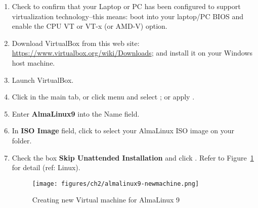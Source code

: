 \begin{enumerate}
\item Check to confirm that your Laptop or PC has been configured to support virtualization technology--this means: boot into your laptop/PC BIOS and enable the CPU VT or VT-x (or AMD-V) option.  
\item Download VirtualBox from this web site: {\url{https://www.virtualbox.org/wiki/Downloads}}; and install it on your Windows host machine. 
\item Launch VirtualBox.
\item Click {} in the main tab, or click {} menu and select {}; or apply {}. 
\item Enter {\bf{AlmaLinux9}} into the Name field. 
\item In {\bf{ISO Image}} field, click to select your AlmaLinux ISO image on your folder. 
\item Check the box {\bf{Skip Unattended Installation}} and click {}. Refer to Figure~\ref{fig:install-alma9-001} for detail (ref: Linux). 

\begin{figure}[hbt!]\centering
   \texttt{[image: figures/ch2/almalinux9-newmachine.png]}
   \caption{Creating new Virtual machine for AlmaLinux 9} \label{fig:install-alma9-001} %
\end{figure}


\end{enumerate}

